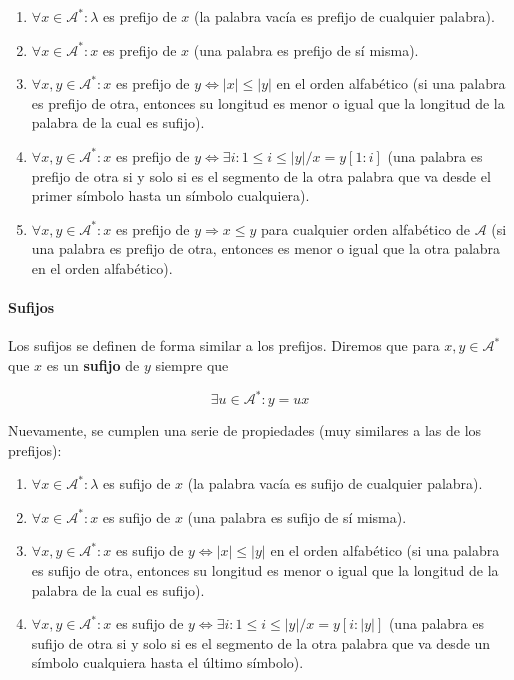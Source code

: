 \begin{enumerate}
\def\labelenumi{\arabic{enumi}.}
\tightlist
\item
  \(\forall x\in\mathcal{A}^*:\lambda\) es prefijo de \(x\) (la palabra
  vacía es prefijo de cualquier palabra).
\item
  \(\forall x\in\mathcal{A}^*:x\) es prefijo de \(x\) (una palabra es
  prefijo de sí misma).
\item
  \(\forall x,y\in\mathcal{A}^*:x\) es prefijo de
  \(y \Leftrightarrow |x| \leq |y|\) en el orden alfabético (si una
  palabra es prefijo de otra, entonces su longitud es menor o igual que
  la longitud de la palabra de la cual es sufijo).
\item
  \(\forall x,y\in\mathcal{A}^*:x\) es prefijo de
  \(y\Leftrightarrow \exists i: 1\leq i\leq |y| / x=y[1:i]\) (una
  palabra es prefijo de otra si y solo si es el segmento de la otra
  palabra que va desde el primer símbolo hasta un símbolo cualquiera).
\item
  \(\forall x,y\in\mathcal{A}^*:x\) es prefijo de
  \(y\Rightarrow x\leq y\) para cualquier orden alfabético de
  \(\mathcal{A}\) (si una palabra es prefijo de otra, entonces es menor
  o igual que la otra palabra en el orden alfabético).
\end{enumerate}

\paragraph{Sufijos}\label{sufijos}

Los sufijos se definen de forma similar a los prefijos. Diremos que para
\(x,y\in\mathcal{A}^*\) que \(x\) es un \textbf{sufijo} de \(y\) siempre
que

\[
\exists u\in\mathcal{A}^*:y=ux
\]

Nuevamente, se cumplen una serie de propiedades (muy similares a las de
los prefijos):

\begin{enumerate}
\def\labelenumi{\arabic{enumi}.}
\tightlist
\item
  \(\forall x\in\mathcal{A}^*:\lambda\) es sufijo de \(x\) (la palabra
  vacía es sufijo de cualquier palabra).
\item
  \(\forall x\in\mathcal{A}^*:x\) es sufijo de \(x\) (una palabra es
  sufijo de sí misma).
\item
  \(\forall x,y\in\mathcal{A}^*:x\) es sufijo de
  \(y \Leftrightarrow |x| \leq |y|\) en el orden alfabético (si una
  palabra es sufijo de otra, entonces su longitud es menor o igual que
  la longitud de la palabra de la cual es sufijo).
\item
  \(\forall x,y\in\mathcal{A}^*:x\) es sufijo de
  \(y\Leftrightarrow \exists i: 1\leq i\leq |y| / x=y[i:|y|]\) (una
  palabra es sufijo de otra si y solo si es el segmento de la otra
  palabra que va desde un símbolo cualquiera hasta el último símbolo).
\end{enumerate}

